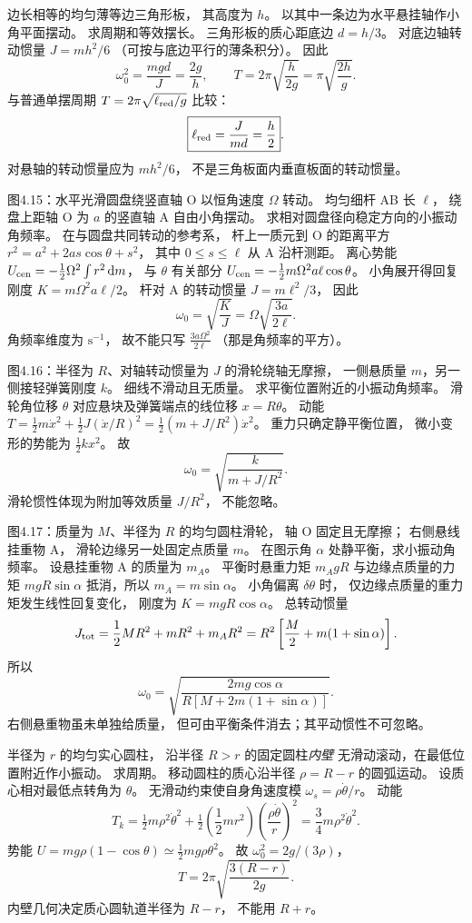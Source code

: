 边长相等的均匀薄等边三角形板，
其高度为 $h$。
以其中一条边为水平悬挂轴作小角平面摆动。
求周期和等效摆长。
\exsolution
三角形板的质心距底边
$d=h/3$。
对底边轴转动惯量
$J=m h^2/6$
（可按与底边平行的薄条积分）。
因此
\[
\omega_0^2=\frac{mgd}{J}
=\frac{2g}{h},
\qquad
\boxed{T=2\pi\sqrt{\frac{h}{2g}}
=\pi\sqrt{\frac{2h}{g}}}.
\]
与普通单摆周期
$T=2\pi\sqrt{\ell_{\rm red}/g}$
比较：
\[
\boxed{\ell_{\rm red}=\frac{J}{md}=\frac h2}.
\]
\excheck 对悬轴的转动惯量应为 $mh^2/6$，
不是三角板面内垂直板面的转动惯量。

图4.15：水平光滑圆盘绕竖直轴 O
以恒角速度 $\Omega$ 转动。
均匀细杆 AB 长 $\ell$，
绕盘上距轴 O 为 $a$ 的竖直轴 A 自由小角摆动。
求相对圆盘径向稳定方向的小振动角频率。
\exsolution
在与圆盘共同转动的参考系，
杆上一质元到 O 的距离平方
$r^2=a^2+2as\cos\theta+s^2$，
其中 $0\le s\le\ell$ 从 A 沿杆测距。
离心势能
$U_{\rm cen}=-\tfrac12\Omega^2\int r^2\,\mathrm dm$，
与 $\theta$ 有关部分
$U_{\rm cen}=-\tfrac12m\Omega^2a\ell\cos\theta$。
小角展开得回复刚度
$K=m\Omega^2a\ell/2$。
杆对 A 的转动惯量
$J=m\ell^2/3$，
因此
\[
\boxed{\omega_0=
\sqrt{\frac KJ}
=\Omega\sqrt{\frac{3a}{2\ell}}}.
\]
\excheck 角频率维度为 $\mathrm{s^{-1}}$，
故不能只写 $\frac{3a\Omega^2}{2\ell}$
（那是角频率的平方）。

图4.16：半径为 $R$、对轴转动惯量为 $J$ 的滑轮绕轴无摩擦，
一侧悬质量 $m$，另一侧接轻弹簧刚度 $k$。
细线不滑动且无质量。
求平衡位置附近的小振动角频率。
\exsolution
滑轮角位移 $\theta$ 对应悬块及弹簧端点的线位移
$x=R\theta$。
动能
$T=\tfrac12m\dot x^2+
\tfrac12J(\dot x/R)^2
=\tfrac12(m+J/R^2)\dot x^2$。
重力只确定静平衡位置，
微小变形的势能为
$\tfrac12kx^2$。
故
\[
\boxed{\omega_0=
\sqrt{\frac{k}{m+J/R^2}}}.
\]
\excheck 滑轮惯性体现为附加等效质量 $J/R^2$，
不能忽略。

图4.17：质量为 $M$、半径为 $R$ 的均匀圆柱滑轮，
轴 O 固定且无摩擦；
右侧悬线挂重物 A，
滑轮边缘另一处固定点质量 $m$。
在图示角 $\alpha$ 处静平衡，求小振动角频率。
\exsolution
设悬挂重物 A 的质量为 $m_A$。
平衡时悬重力矩
$m_AgR$ 与边缘点质量的力矩
$mgR\sin\alpha$ 抵消，所以
$m_A=m\sin\alpha$。
小角偏离 $\delta\theta$ 时，
仅边缘点质量的重力矩发生线性回复变化，
刚度为
$K=mgR\cos\alpha$。
总转动惯量
\[
J_{\rm tot}=\frac12MR^2+mR^2+m_AR^2
=R^2\left[\frac M2+m(1+\sin\alpha)\right].
\]
所以
\[
\boxed{\omega_0=
\sqrt{\frac{2mg\cos\alpha}
{R[M+2m(1+\sin\alpha)]}}}.
\]
\excheck 右侧悬重物虽未单独给质量，
但可由平衡条件消去；其平动惯性不可忽略。

半径为 $r$ 的均匀实心圆柱，
沿半径 $R>r$ 的固定圆柱\emph{内壁}
无滑动滚动，在最低位置附近作小振动。
求周期。
\exsolution
移动圆柱的质心沿半径
$\rho=R-r$ 的圆弧运动。
设质心相对最低点转角为 $\theta$。
无滑动约束使自身角速度模
$\omega_s=\rho\dot\theta/r$。
动能
\[
T_k=\tfrac12m\rho^2\dot\theta^2+
\tfrac12\left(\frac12mr^2\right)
\left(\frac{\rho\dot\theta}{r}\right)^2
=\frac34m\rho^2\dot\theta^2.
\]
势能
$U=mg\rho(1-\cos\theta)
\simeq\tfrac12mg\rho\theta^2$。
故
$\omega_0^2=2g/(3\rho)$，
\[
\boxed{T=2\pi\sqrt{\frac{3(R-r)}{2g}}}.
\]
\excheck 内壁几何决定质心圆轨道半径为 $R-r$，
不能用 $R+r$。

